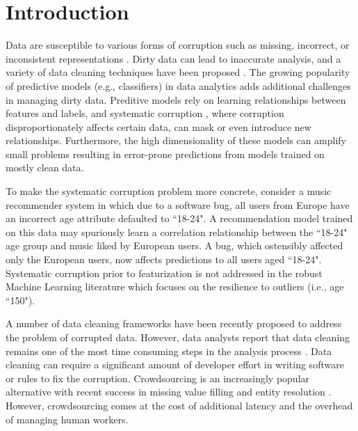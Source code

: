 \section{Introduction}
Data are susceptible to various forms of corruption such as missing, incorrect, or inconsistent representations \cite{Gartner}.
Dirty data can lead to inaccurate analysis, and a variety of data cleaning techniques have been proposed \cite{rahm2000data}.
The growing popularity of predictive models (e.g., classifiers) in data analytics \cite{bdas, alexandrov2014stratosphere, crotty2014tupleware, hellerstein2012madlib} adds additional challenges in managing dirty data.
Preditive models rely on learning relationships between features and labels, and systematic corruption \cite{taylor1982introduction}, where corruption disproportionately affects certain data, can mask or even introduce new relationships.
Furthermore, the high dimensionality of these models can amplify small problems \cite{xiaofeature} resulting in error-prone predictions from models trained on mostly clean data.

To make the systematic corruption problem more concrete, consider a music recommender system in which due to a software bug, all users from Europe have an incorrect age attribute defaulted to ``18-24".
A recommendation model trained on this data may spuriously learn a correlation relationship between the ``18-24" age group and music liked by European users.
A bug, which ostensibly affected only the European users, now affects predictions to all users aged ``18-24".
Systematic corruption prior to featurization is not addressed in the robust Machine Learning literature which focuses on the resilience to outliers (i.e., age ``150").

A number of data cleaning frameworks have been recently proposed \cite{khayyat2015bigdansing, chu2015katara, sampleclean} to address the problem of corrupted data.
However, data analysts report that data cleaning remains one of the most time consuming steps in the analysis process \cite{nytimes}.
Data cleaning can require a significant amount of developer effort in writing software or rules to fix the corruption.
Crowdsourcing is an increasingly popular alternative with recent success in missing value filling and entity resolution \cite{gokhale2014corleone, park2014crowdfill, sampleclean,chu2015katara}.
However, crowdsourcing comes at the cost of additional latency and the overhead of managing human workers.

